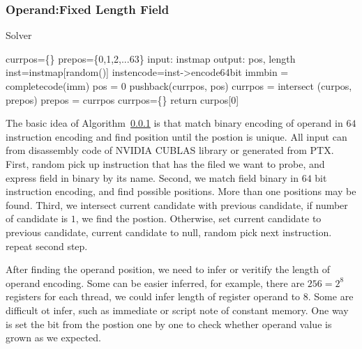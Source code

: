 \documentclass{sig-alternate-05-2015}
\begin{document}
\subsubsection{Operand:Fixed Length Field}
\begin{algorithm}
      \caption{Solver}\label{integer_solver}
  \begin{algorithmic}[1]
      \State currpos=\{\}
      \State prepos=\{0,1,2,...63\}
      \State input: instmap
      \State output: pos, length
      \State inst=instmap[random()]
      \State instencode=inst->encode64bit
      \State immbin = completecode(imm)
      \State pos = 0
      \State pushback(currpos, pos)
      \EndIf
      \EndWhile
      \State currpos = intersect (curpos, prepos)
      \State prepos = currpos
      \State currpos=\{\}
      \EndIf
      \EndWhile
      \State return curpos[0]
  \end{algorithmic}
\end{algorithm}
The basic idea of Algorithm~\ref{} is that match binary encoding of operand in $64$ instruction encoding and find
position until the postion is unique. All input can from disassembly code of NVIDIA CUBLAS library or generated from PTX.
First, random pick up instruction that has the filed we want to probe, and express field in binary by its name. Second, we match field binary in $64$
bit instruction encoding, and find possible positions. More than one positions may be found. Third, we intersect current candidate
with previous candidate, if number of candidate is $1$, we find the postion. Otherwise, set current candidate to previous candidate,
current candidate to null, random pick next instruction. repeat second step.

After finding the operand position, we need to infer or veritify the length of operand encoding. Some can be easier
inferred, for example, there are $256=2^{8}$ registers for each thread, we could infer length of register operand to $8$.
Some are difficult ot infer, such as immediate or script note of constant memory. One way is set the bit from the
postion one by one to check whether operand value is grown as we expected.
\end{document}
